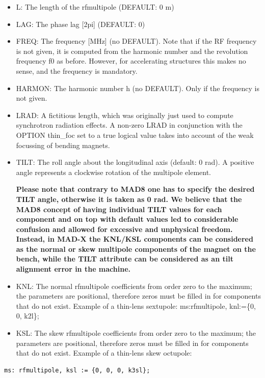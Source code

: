 \begin{itemize}
   \item L: The length of the rfmultipole (DEFAULT: 0 m) 
   \item LAG: The phase lag [2pi] (DEFAULT: 0) 
   \item FREQ: The frequency [MHz] (no DEFAULT). Note that if the RF
     frequency is not given, it is computed from the harmonic
     number and the revolution frequency f0 as before. However, for
     accelerating structures this makes no sense, and the frequency
     is mandatory.  
   \item HARMON: The harmonic number h (no DEFAULT). Only if the
     frequency is not given. 
   \item LRAD: A fictitious length, which was originally just used to
     compute synchrotron radiation effects. A non-zero LRAD in
     conjunction with the OPTION thin\_foc set to a true logical value
     takes into account of the weak focussing of bending magnets.  
   \item TILT: The roll angle about the longitudinal axis (default: 0
     rad). A positive angle represents a clockwise rotation of the
     multipole element.            

     \textbf{Please note that contrary to MAD8 one has to specify the
       desired TILT angle, otherwise it is taken as 0 rad. We
       believe that the MAD8 concept of having individual TILT
       values for each component and on top with default values
       led to considerable confusion and allowed for excessive
       and unphysical freedom. Instead, in MAD-X the KNL/KSL
       components can be considered as the normal or skew
       multipole components of the magnet on the bench, while the
       TILT attribute can be considered as an tilt alignment
       error in the machine.} 

   \item KNL: The normal rfmultipole coefficients from order zero to
     the maximum; the parameters are positional, therefore zeros
     must be filled in for components that do not exist. Example of
     a thin-lens sextupole: ms:rfmultipole, knl:=\{0, 0, k2l\}; 
   \item KSL: The skew rfmultipole coefficients from order zero to
     the maximum; the parameters are positional, therefore zeros
     must be filled in for components that do not exist. Example of
     a thin-lens skew octupole:
\end{itemize}

\begin{verbatim}
ms: rfmultipole, ksl := {0, 0, 0, k3sl};
\end{verbatim}

